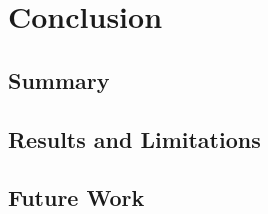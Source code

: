 \documentclass[../Main/thesis.tex]{subfiles}
\begin{document}
\chapter{Conclusion}%
\label{ch:conclusion}

\section{Summary}%
\label{sec:summary}

\section{Results and Limitations}%
\label{sec:results_and_limitations}

\section{Future Work}%
\label{sec:future_work}


\blankpage
\end{document}
